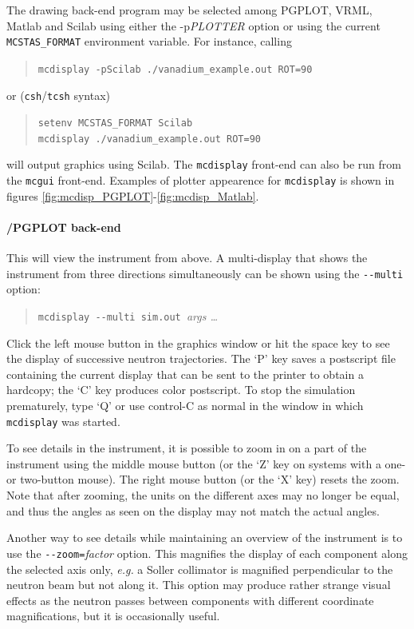    
The drawing back-end program may be selected among PGPLOT, VRML, Matlab and Scilab using either the -p{\it PLOTTER} option or using the current \verb+MCSTAS_FORMAT+ environment variable. 
For instance, calling
\begin{quote}
  \verb+mcdisplay -pScilab ./vanadium_example.out ROT=90+
\end{quote}
or (\verb+csh+/\verb+tcsh+ syntax)
\begin{quote}
  \verb+setenv MCSTAS_FORMAT Scilab+\\
  \verb+mcdisplay ./vanadium_example.out ROT=90+
\end{quote}
will output graphics using Scilab.
The \verb+mcdisplay+ front-end can also be run from the \verb+mcgui+ front-end.
Examples of plotter appearence for \verb+mcdisplay+ is shown in figures
 \ref{fig:mcdisp_PGPLOT}-\ref{fig:mcdisp_Matlab}.

\paragraph{\MCS /PGPLOT back-end}

This will view the instrument from above. A
multi-display that shows the instrument from three directions
simultaneously can be shown using the \verb+--multi+ option:
\begin{quote}
  \verb+mcdisplay --multi sim.out +{\it args \ldots}
\end{quote}

Click the left mouse button in the graphics window or hit the space key
to see the display of successive neutron trajectories. The `P' key saves
a postscript file containing the current display that can be sent to the
printer to obtain a hardcopy; the `C' key produces color postscript.
To stop the simulation
prematurely, type `Q' or use control-C as normal in the window in which
\verb+mcdisplay+ was started.

To see details in the instrument, it is possible to zoom in on a part of
the instrument using the middle mouse button (or the `Z' key on systems
with a one- or two-button mouse). The right mouse button (or the `X'
key) resets the zoom. Note that after zooming, the units on the
different axes may no longer be equal, and thus the angles as seen on
the display may not match the actual angles.

Another way to see details while maintaining an overview of the
instrument is to use the \verb+--zoom=+\textit{factor} option. This
magnifies the display of each component along the selected axis only,
{\em e.g.} a Soller collimator is magnified perpendicular to the neutron beam
but not along it. This option may produce rather strange visual effects
as the neutron passes between components with different coordinate
magnifications, but it is occasionally useful.

